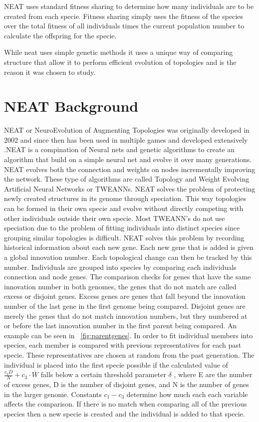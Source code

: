 \documentclass[12pt]{ucthesis} \newif\ifpdf \ifx\pdfoutput\undefined
\begin{document}
NEAT uses standard fitness sharing to determine how many individuals are to be
created from each specie. Fitness sharing simply uses the fitness of the species
over the total fitness of all individuals times the current population number to
calculate the offspring for the specie.

While neat uses simple genetic methods it uses a unique way of comparing
structure that allow it to perform efficient evolution of topologies and is the
reason it was chosen to study.

\section{NEAT Background}

NEAT or NeuroEvolution of Augmenting Topologies  was originally developed in
2002 and since then has been used in multiple games and developed extensively
\cite{stanley:phd04}.NEAT is a compination of Neural nets and genetic algorithms
to create an algorithm that build on a simple neural net and evolve it over many
generations. NEAT evolves both the connection and weights on nodes incrementally
improving the network. These type of algorithms are called Topology and Weight
Evolving Artiﬁcial Neural Networks or TWEANNs. NEAT solves the problem of
protecting newly created structures in its genome through speciation. This way
topologies can be formed in their own specie and evolve without directly
competing with other individuals outside their own specie. Most TWEANN’s do not
use speciation due to the problem of fitting individuals into distinct species
since grouping similar topologies is difficult. NEAT solves this problem by
recording historical information about each new gene. Each new gene that is
added is given a global innovation number. Each topological change can then be
tracked by this number. Individuals are grouped into species by comparing each
individuals connection and node genes. The comparison checks for genes that have
the same innovation number in both genomes, the genes that do not match are
called excess or disjoint genes. Excess genes are genes that fall beyond the
innovation number of the last gene in the first genome being compared. Disjoint
genes are merely the genes that do not match innovation numbers, but they
numbered at or before the last innovation number in the first parent being
compared. An example can be seen in  ~\ref{fig:parentgenes}. In order to fit
individual members into species, each member is compared with previous
representatives for each past specie. These representatives are chosen at random
from the past generation. The individual is placed into the first specie
possible if the calculated value of $\frac{c_{2}D}{N} + c_{3} \cdot
\overline{W}$ falls below a certain threshold parameter $\delta$ , where E are
the number of excess genes, D is the number of disjoint genes, and N is the
number of genes in the larger genome. Constants $c_{1} - c_{3}$ determine how
much each each variable affects the comparison. If there is no match when comparing all of the previous species then a new specie is created and the individual is added to that specie.
\end{document}
